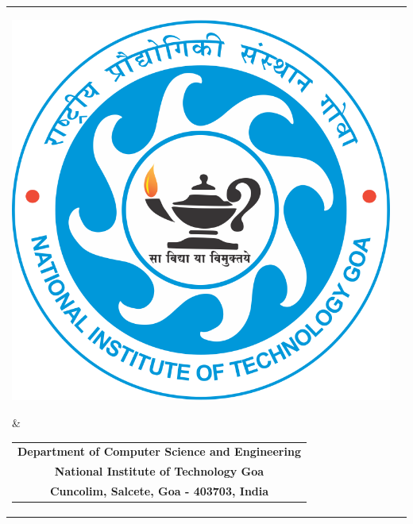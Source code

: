 \documentclass[a4paper,12pt]{report}
\begin{document}
\thispagestyle{empty}
\BgThispage
\begin{table}[]
\centering
\label{my-label}
\begin{tabular}{lc}

\parbox[c]{1em}{
      \includegraphics[scale=0.27]{images/NIT_Goa_Logo.png}} & \begin{tabular}[c]{@{}c@{}} 
      \hspace{20mm}   
      {\textbf{{Department of Computer Science and Engineering}}}\\
  \hspace{53mm}    
\small{\textbf{{National Institute of Technology Goa}}}\\
\hspace{50mm}
\small{\textbf{{Cuncolim, Salcete, Goa - 403703, India}}}
\end{tabular}
\end{tabular}
\end{table}
\vspace{-10mm}
\end{document}
